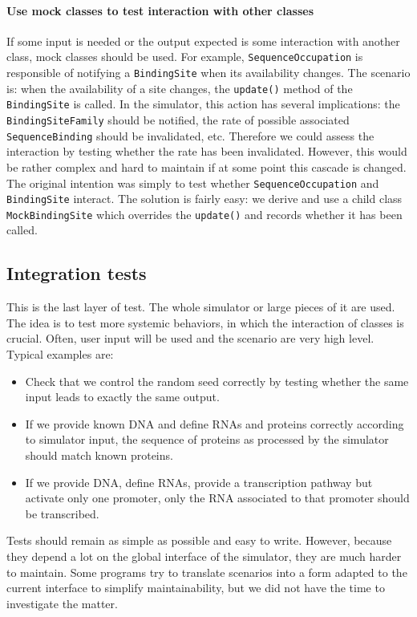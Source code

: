 \paragraph{Use mock classes to test interaction with other classes} If some input is needed or the output expected is some interaction with another class, mock classes should be used. For example, \texttt{SequenceOccupation} is responsible of notifying a \texttt{BindingSite} when its availability changes. The scenario is: when the availability of a site changes, the \texttt{update()} method of the \texttt{BindingSite} is called. In the simulator, this action has several implications: the \texttt{BindingSiteFamily} should be notified, the rate of possible associated \texttt{SequenceBinding} should be invalidated, etc. Therefore we could assess the interaction by testing whether the rate has been invalidated. However, this would be rather complex and hard to maintain if at some point this cascade is changed. The original intention was simply to test whether \texttt{SequenceOccupation} and \texttt{BindingSite} interact. The solution is fairly easy: we derive and use a child class \texttt{MockBindingSite} which overrides the \texttt{update()} and records whether it has been called.

\subsection{Integration tests}

This is the last layer of test. The whole simulator or large pieces of it are used. The idea is to test more systemic behaviors, in which the interaction of classes is crucial. Often, user input will be used and the scenario are very high level. Typical examples are:
\begin{itemize}
  \item Check that we control the random seed correctly by testing whether the same input leads to exactly the same output.  
  \item If we provide known DNA and define RNAs and proteins correctly according to simulator input, the sequence of proteins as processed by the simulator should match known proteins.
  \item If we provide DNA, define RNAs, provide a transcription pathway but activate only one promoter, only the RNA associated to that promoter should be transcribed.
\end{itemize}

Tests should remain as simple as possible and easy to write. However, because they depend a lot on the global interface of the simulator, they are much harder to maintain. Some programs try to translate scenarios into a form adapted to the current interface to simplify maintainability, but we did not have the time to investigate the matter.

